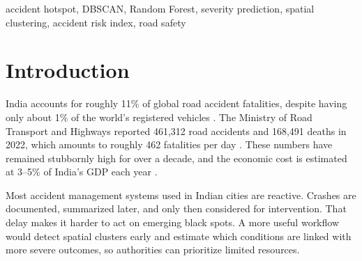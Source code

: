 \documentclass[conference]{IEEEtran}
\begin{document}
\begin{abstract}
Road traffic accidents remain a major public safety problem in India, where more than 150,000 fatalities are reported each year. This paper presents an integrated pipeline that combines DBSCAN spatial clustering with Random Forest classification to identify accident black spots and estimate accident severity. The study uses 12,316 Indian road accident records and 17 engineered features. DBSCAN with haversine distance and $\varepsilon = 0.045$ radians identifies 9 accident clusters. The Random Forest model, trained with 200 estimators and balanced class weighting, reaches 84.66\% test accuracy and a weighted F1-score of 0.7793. Five-fold stratified cross-validation gives a mean accuracy of 84.76\%. A composite Accident Risk Index (ARI) combines severity, density, and environmental factors using weights derived from model feature importances. The resulting risk map separates clusters into Low, Moderate, and Severe tiers, with hour of day, cause of accident, and day of week emerging as the most informative predictors. The workflow is exposed through a Flask REST API.
\end{abstract}

\begin{IEEEkeywords}
accident hotspot, DBSCAN, Random Forest, severity prediction, spatial clustering, accident risk index, road safety
\end{IEEEkeywords}

\section{Introduction}

India accounts for roughly 11\% of global road accident fatalities, despite having only about 1\% of the world's registered vehicles \cite{b1}. The Ministry of Road Transport and Highways reported 461,312 road accidents and 168,491 deaths in 2022, which amounts to roughly 462 fatalities per day \cite{b2}. These numbers have remained stubbornly high for over a decade, and the economic cost is estimated at 3--5\% of India's GDP each year \cite{b3}.

Most accident management systems used in Indian cities are reactive. Crashes are documented, summarized later, and only then considered for intervention. That delay makes it harder to act on emerging black spots. A more useful workflow would detect spatial clusters early and estimate which conditions are linked with more severe outcomes, so authorities can prioritize limited resources.
\end{document}
